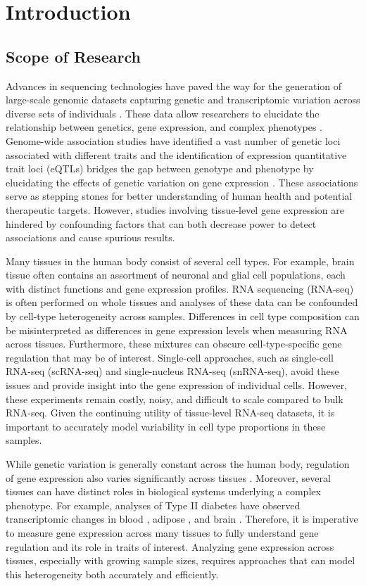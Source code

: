 \chapter{Introduction}
\section{Scope of Research}
Advances in sequencing technologies have paved the way for the generation of large-scale genomic datasets capturing genetic and transcriptomic variation across diverse sets of individuals \cite{Bycroft2018, GTEx_Consortium2020-xx}. These data allow researchers to elucidate the relationship between genetics, gene expression, and complex phenotypes \cite{Gusev2016}. Genome-wide association studies have identified a vast number of genetic loci associated with different traits \cite{gwas} and the identification of expression quantitative trait loci (eQTLs) bridges the gap between genotype and phenotype by elucidating the effects of genetic variation on gene expression \cite{Nica2013}. These associations serve as stepping stones for better understanding of human health and potential therapeutic targets. However, studies involving tissue-level gene expression are hindered by confounding factors that can both decrease power to detect associations and cause spurious results.

Many tissues in the human body consist of several cell types. For example, brain tissue often contains an assortment of neuronal and glial cell populations, each with distinct functions and gene expression profiles. RNA sequencing (RNA-seq) is often performed on whole tissues and analyses of these data can be confounded by cell-type heterogeneity across samples. Differences in cell type composition can be misinterpreted as differences in gene expression levels when measuring RNA across tissues. Furthermore, these mixtures can obscure cell-type-specific gene regulation that may be of interest. Single-cell approaches, such as single-cell RNA-seq (scRNA-seq) and single-nucleus RNA-seq (snRNA-seq), avoid these issues and provide insight into the gene expression of individual cells. However, these experiments remain costly, noisy, and difficult to scale compared to bulk RNA-seq. Given the continuing utility of tissue-level RNA-seq datasets, it is important to accurately model variability in cell type proportions in these samples.

While genetic variation is generally constant across the human body, regulation of gene expression also varies significantly across tissues \cite{GTEx_Consortium2020-xx}. Moreover, several tissues can have distinct roles in biological systems underlying a complex phenotype. For example, analyses of Type II diabetes have observed transcriptomic changes in blood \cite{Christodoulou2019}, adipose \cite{Miao2020}, and brain \cite{Zhou2019}. Therefore, it is imperative to measure gene expression across many tissues to fully understand gene regulation and its role in traits of interest. Analyzing gene expression across tissues, especially with growing sample sizes, requires approaches that can model this heterogeneity both accurately and efficiently.

